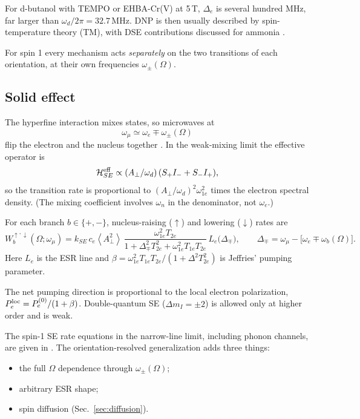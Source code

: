 \documentclass[11pt]{article}
\newcommand{\avg}[1]{\left\langle #1\right\rangle}
\begin{document}
For d-butanol with TEMPO or EHBA-Cr(V) at 5\,T, $\Delta_e$ is several hundred MHz, far larger
than $\omega_d/2\pi=32.7$\,MHz. DNP is then usually described by spin-temperature theory (TM),
with DSE contributions discussed for ammonia
\cite{Goertz2004,Meyer2004,deBoer1976,Wenckebach2016}.

For spin 1 every mechanism acts \emph{separately} on the two transitions of each orientation,
at their own frequencies $\omega_\pm(\Omega)$.

\subsection{Solid effect}
The hyperfine interaction mixes states, so microwaves at
\[
\omega_\mu\simeq\omega_e\mp\omega_\pm(\Omega)
\]
flip the electron and the nucleus together \cite{Jeffries1963,AbragamGoldman1978,Hovav2010}.
In the weak-mixing limit the effective operator is
\[
\mathcal H^{\rm eff}_{SE}\propto(A_\perp/\omega_d)\,(S_+I_-+S_-I_+),
\]
so the transition rate is proportional to $(A_\perp/\omega_d)^2\omega_{1e}^2$ times the
electron spectral density. (The mixing coefficient involves $\omega_n$ in the denominator, not
$\omega_e$.)

For each branch $b\in\{+,-\}$, nucleus-raising ($\uparrow$) and lowering ($\downarrow$) rates
are
\begin{equation}
W_b^{\uparrow,\downarrow}(\Omega;\omega_\mu)=k_{SE}\,c_e\avg{A_\perp^2}\,
\frac{\omega_{1e}^2T_{2e}}{1+\Delta_{\mp}^2T_{2e}^2+\omega_{1e}^2T_{1e}T_{2e}}\,
L_e\big(\Delta_\mp\big),\qquad
\Delta_\mp=\omega_\mu-\big[\omega_e\mp\omega_b(\Omega)\big].
\label{eq:se}
\end{equation}
Here $L_e$ is the ESR line and $\beta=\omega_{1e}^2T_{1e}T_{2e}/(1+\Delta^2T_{2e}^2)$ is
Jeffries' pumping parameter.

The net pumping direction is proportional to the local electron polarization,
$P_e^{\rm loc}=P_e^{(0)}/(1+\beta)$. Double-quantum SE ($\Delta m_I=\pm2$) is allowed only at
higher order and is weak.

The spin-1 SE rate equations in the narrow-line limit, including phonon channels, are given in
\cite{FeddersSouers1987}. The orientation-resolved generalization adds three things:
\begin{itemize}
\item the full $\Omega$ dependence through $\omega_\pm(\Omega)$;
\item arbitrary ESR shape;
\item spin diffusion (Sec.~\ref{sec:diffusion}).
\end{itemize}
\end{document}
